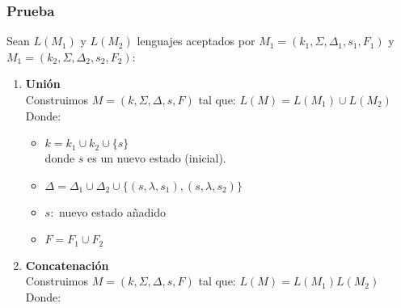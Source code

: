 \subsubsection{Prueba}
Sean $L(M_1)$ y $L(M_2)$ lenguajes aceptados por $M_1=(k_1,\Sigma,\Delta_1,s_1,F_1)$ y $M_1=(k_2,\Sigma,\Delta_2,s_2,F_2)$:
\begin{enumerate}[label=\textbf{\alph*)}]

\item \textbf{Unión} \\ ${ }$\\
Construimos $M=(k,\Sigma,\Delta,s,F)$ tal que: $L(M)=L(M_1)\cup L(M_2)$ \\
Donde:
\begin{itemize}
\item $k=k_1 \cup k_2 \cup \{ s\}$ \\
	donde $s$ es un nuevo estado (inicial).
\item $\Delta=\Delta_1 \cup \Delta_2 \cup \{ (s,\lambda,s_1),(s,\lambda,s_2)\}$
\item $s:$ nuevo estado añadido
\item $F=F_1 \cup F_2$
\end{itemize}

\item \textbf{Concatenación} \\ ${ }$\\
Construimos $M=(k,\Sigma,\Delta,s,F)$ tal que: $L(M)=L(M_1)L(M_2)$ \\
Donde:


\end{enumerate}
